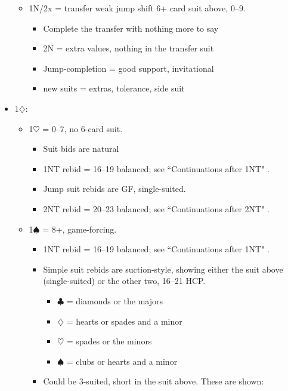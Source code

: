\documentclass[a4paper,14pt]{extarticle}
\begin{document}
\begin{itemize}
\begin{itemize}
\begin{itemize}
		\end{itemize}
   \item 1N/2x = transfer weak jump shift 6+ card suit above, 0--9.
		\begin{itemize}
		\item Complete the transfer with nothing more to say
		\item 2N = extra values, nothing in the transfer suit
		\item Jump-completion = good support, invitational
		\item new suits = extras, tolerance, side suit
		\end{itemize}
	\end{itemize}

\newpage

\item 1$\diamondsuit$:
	\begin{itemize}
   \item 1$\heartsuit$ = 0--7, no 6-card suit.
		\begin{itemize}
		\item Suit bids are natural
      \item 1NT rebid = 16--19 balanced; see ``Continuations after 1NT" .
      \item Jump suit rebids are GF, single-suited.
      \item 2NT rebid = 20--23 balanced; see ``Continuations after 2NT" .
		\end{itemize}
   \item 1$\spadesuit$ = 8+, game-forcing.
		\begin{itemize}
      \item 1NT rebid = 16--19 balanced; see ``Continuations after 1NT" .
      \item Simple suit rebids are suction-style, showing either the suit above
         (single-suited) or the other two, 16--21 HCP.
			\begin{itemize}
			\item $\clubsuit$ = diamonds or the majors
			\item $\diamondsuit$ = hearts or spades and a minor
			\item $\heartsuit$ = spades or the minors
			\item $\spadesuit$ = clubs or hearts and a minor
			\end{itemize}
		\item Could be 3-suited, short in the suit above. These are shown: 
			\begin{itemize}

\end{itemize}
\end{itemize}
\end{itemize}
\end{itemize}
\end{document}
